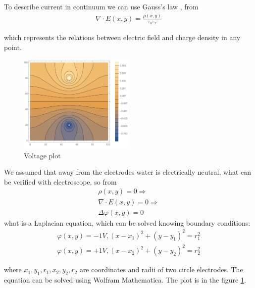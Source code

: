 \documentclass{article}
\begin{document}
To describe current in continuum we can use Gauss's law \cite{gauss}, \cite{landavshic} 
from \begin{equation}
  \begin{aligned}
  \nabla\cdot E (x, y) = \frac{\rho (x, y)}{\varepsilon_0 \varepsilon_r}
  \end{aligned}
\end{equation}
	  
   which represents the relations between electric field and charge density in any point.\par

\begin{figure}[h]
    \centering
    \includegraphics[width=0.5\textwidth]{theory plot.pdf}
    \caption{Voltage plot}
    \label{fig:mesh3}
\end{figure}

We assumed that away from the electrodes water is electrically neutral, what can be verified with electroscope, so from \begin{equation}
  \begin{aligned}
    \rho (x, y) = 0 \Rightarrow\\
  	\nabla \cdot E (x, y) = 0 \Rightarrow \\
    \Delta \varphi (x, y) = 0 
  \end{aligned}
\end{equation}
 what is a Laplacian equation, which can be solved knowing boundary conditions:
\begin{equation}
  \begin{aligned}
    \varphi (x, y) = -1 V, (x - x_1)^2 + (y - y_1)^2 = r_1^2 \\
    \varphi (x, y) = +1 V, (x - x_2)^2 + (y - y_2)^2 = r_2^2
  \end{aligned}
\end{equation}

where $x_1, y_1, r_1, x_2, y_2, r_2$ are coordinates and radii of two circle electrodes. The equation can be solved using Wolfram Mathematica. The plot is in the figure \ref{fig:mesh3}. \par
\end{document}
